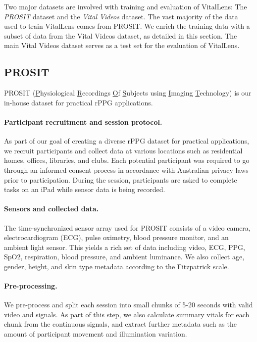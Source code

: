 \documentclass{article}
\begin{document}
Two major datasets are involved with training and evaluation of VitalLens:
The \textit{PROSIT} dataset and the \textit{Vital Videos} dataset.
The vast majority of the data used to train VitalLens comes from PROSIT.
We enrich the training data with a subset of data from the Vital Videos dataset, as detailed in this section.
The main Vital Videos dataset serves as a test set for the evaluation of VitalLens.

\subsection{PROSIT}

PROSIT (\underline{P}hysiological \underline{R}ecordings \underline{O}f \underline{S}ubjects using \underline{I}maging \underline{T}echnology) is our in-house dataset for practical rPPG applications.

\paragraph{Participant recruitment and session protocol.} 
As part of our goal of creating a diverse rPPG dataset for practical applications, we recruit participants and collect data at various locations such as residential homes, offices, libraries, and clubs.
Each potential participant was required to go through an informed consent process in accordance with Australian privacy laws prior to participation.
During the session, participants are asked to complete tasks on an iPad while sensor data is being recorded.

\paragraph{Sensors and collected data.}
The time-synchronized sensor array used for PROSIT consists of a video camera, electrocardiogram (ECG), pulse oximetry, blood pressure monitor, and an ambient light sensor.
This yields a rich set of data including video, ECG, PPG, SpO2, respiration, blood pressure, and ambient luminance.
We also collect age, gender, height, and skin type metadata according to the Fitzpatrick scale.

\paragraph{Pre-processing.}
We pre-process and split each session into small chunks of 5-20 seconds with valid video and signals.
As part of this step, we also calculate summary vitals for each chunk from the continuous signals, and extract further metadata such as the amount of participant movement and illumination variation.
\end{document}
